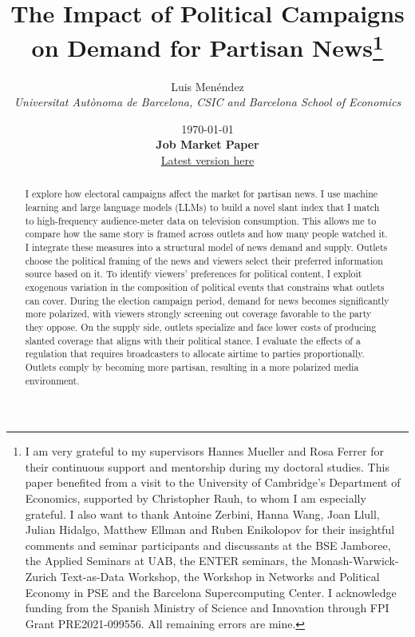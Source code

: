 \documentclass[12pt]{article}
\title{The Impact of Political Campaigns on Demand for Partisan News\thanks{I am very grateful to my supervisors Hannes Mueller and Rosa Ferrer for their continuous support and mentorship during my doctoral studies. This paper benefited from a visit to the University of Cambridge’s Department of Economics, supported by Christopher Rauh, to whom I am especially grateful. I also want to thank Antoine Zerbini,  Hanna Wang, Joan Llull, Julian Hidalgo, Matthew Ellman and Ruben Enikolopov for their insightful comments and seminar participants and discussants at the BSE Jamboree, the Applied Seminars at UAB, the ENTER seminars, the Monash-Warwick-Zurich Text-as-Data Workshop, the Workshop in Networks and Political Economy in PSE and the Barcelona Supercomputing Center. I acknowledge funding from the Spanish Ministry of Science and Innovation through FPI Grant PRE2021-099556. All remaining errors are mine.}}
\author{Luis  Menéndez \\
	\textit{\small Universitat Autònoma de Barcelona, CSIC and Barcelona School of Economics}
} %
\date{%
	\today\\[0.2ex]
	{\bfseries Job Market Paper}\\[0.2ex]
	{\normalsize\href{https://www.dropbox.com/scl/fi/f3546vufz11vj5r63xml4/elections_draft.pdf?rlkey=exjw9vm3sasahlb54ohjf2tyx\&e=1\&dl=0}{Latest version here}}
}
\renewcommand\thepart{}      %
\renewcommand\partname{}      %
\begin{document}
	
\renewcommand\thepart{}      %
\renewcommand\partname{}      %

	
	\maketitle
	\enlargethispage{2\baselineskip}
	
	
	\vspace{-1cm}
	
	
	\begin{abstract}
		



I explore how electoral campaigns affect the market for partisan news. I use machine learning and large language models (LLMs) to build a novel slant index that I match to high-frequency audience-meter data on television consumption. This allows me to compare how the same story is framed across outlets and how many people watched it. I integrate these measures into a structural model of news demand and supply. Outlets choose the political framing of the news and viewers select their preferred information source based on it. To identify viewers’ preferences for political content, I exploit exogenous variation in the composition of political events that constrains what outlets can cover. During the election campaign period, demand for news becomes significantly more polarized, with viewers strongly screening out coverage favorable to the party they oppose. On the supply side, outlets specialize and face lower costs of producing slanted coverage that aligns with their political stance. I evaluate the effects of a regulation that requires broadcasters to allocate airtime to parties proportionally. Outlets comply by becoming more partisan, resulting in a more polarized media environment.











	
	
		\end{abstract}
		
		
		\vfill
		
\end{document}
